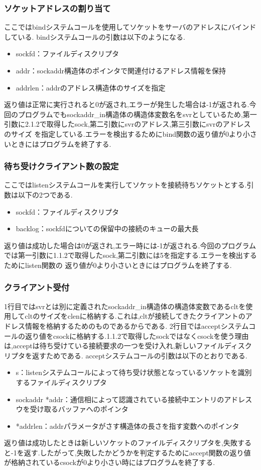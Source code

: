 \documentclass[dvipdfmx]{jarticle}
\begin{document}
\subsubsection{ソケットアドレスの割り当て}
ここではbindシステムコールを使用してソケットをサーバのアドレスにバインドしている.
bindシステムコールの引数は以下のようになる.\cite{14}
\begin{itemize}
    \item sockfd：ファイルディスクリプタ
    \item addr：sockaddr構造体のポインタで関連付けるアドレス情報を保持
    \item addrlen：addrのアドレス構造体のサイズを指定
\end{itemize}
返り値は正常に実行されると0が返され,エラーが発生した場合は-1が返される.今回のプログラムでもsockaddr\_in構造体の構造体変数名をsvrとしているため,第一引数に2.1.2で取得したsock,第二引数にsvrのアドレス,第三引数にsvrのアドレスのサイズ
を指定している.エラーを検出するためにbind関数の返り値が0より小さいときにはプログラムを終了する.
\subsubsection{待ち受けクライアント数の設定}
ここではlistenシステムコールを実行してソケットを接続待ちソケットとする.\cite{15}引数は以下の2つである.
\begin{itemize}
    \item sockfd：ファイルディスクリプタ
    \item backlog：sockfdについての保留中の接続のキューの最大長
\end{itemize}
返り値は成功した場合は0が返され,エラー時には-1が返される.今回のプログラムでは第一引数に1.1.2で取得したsock,第二引数には5を指定する.エラーを検出するためにlisten関数の
返り値が0より小さいときにはプログラムを終了する.
\subsubsection{クライアント受付}
1行目ではsvrとは別に定義されたsockaddr\_in構造体の構造体変数であるcltを使用してcltのサイズをclenに格納する.これは,cltが接続してきたクライアントのアドレス情報を格納するためのものであるからである.
2行目ではacceptシステムコールの返り値をcsockに格納する.1.1.2で取得したsockではなくcsockを使う理由は,acceptは待ち受けている接続要求の一つを受け入れ,新しいファイルディスクリプタを返すためである.
acceptシステムコールの引数は以下のとおりである.
\begin{itemize}
    \item s：listenシステムコールによって待ち受け状態となっているソケットを識別するファイルディスクリプタ
    \item sockaddr *addr：通信相によって認識されている接続中エントリのアドレスウを受け取るバッファへのポインタ
    \item *addrlen：addrパラメータがさす構造体の長さを指す変数へのポインタ
\end{itemize}
返り値は成功したときは新しいソケットのファイルディスクリプタを,失敗すると-1を返す.したがって,失敗したかどうかを判定するためにaccept関数の返り値が格納されているcsockが0より小さい時にはプログラムを終了する.
\end{document}
